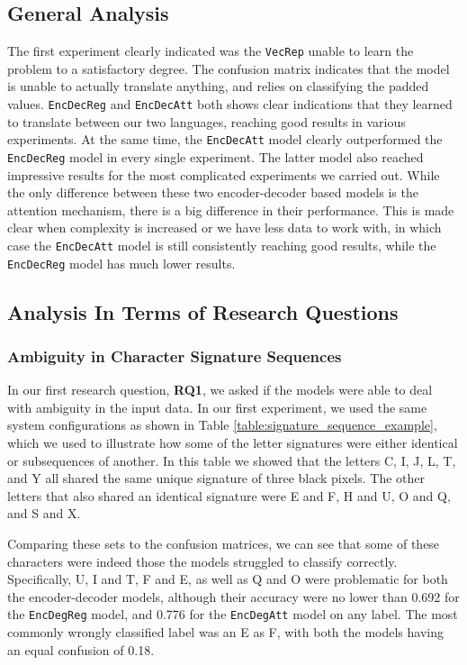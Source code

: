 \subsection{General Analysis}
The first experiment clearly indicated was the {\tt VecRep} unable to learn the problem to a satisfactory degree. The confusion matrix indicates that the model is unable to actually translate anything, and relies on classifying the padded values. {\tt EncDecReg} and {\tt EncDecAtt} both shows clear indications that they learned to translate between our two languages, reaching good results in various experiments. At the same time, the {\tt EncDecAtt} model clearly outperformed the {\tt EncDecReg} model in every single experiment. The latter model also reached impressive results for the most complicated experiments we carried out. While the only difference between these two encoder-decoder based models is the attention mechanism, there is a big difference in their performance. This is made clear when complexity is increased or we have less data to work with, in which case the {\tt EncDecAtt} model is still consistently reaching good results, while the {\tt EncDecReg} model has much lower results.

\subsection{Analysis In Terms of Research Questions}

\subsubsection{Ambiguity in Character Signature Sequences}
In our first research question, \textbf{RQ1}, we asked if the models were able to deal with ambiguity in the input data. In our first experiment, we used the same system configurations as shown in Table \ref{table:signature_sequence_example}, which we used to illustrate how some of the letter signatures were either identical or subsequences of another. In this table we showed that the letters C, I, J, L, T, and Y all shared the same unique signature of three black pixels. The other letters that also shared an identical signature were E and F, H and U, O and Q, and S and X. 

Comparing these sets to the confusion matrices, we can see that some of these characters were indeed those the models struggled to classify correctly. Specifically, U, I and T, F and E, as well as Q and O were problematic for both the encoder-decoder models, although their accuracy were no lower than 0.692 for the {\tt EncDegReg} model, and 0.776 for the {\tt EncDegAtt} model on any label. The most commonly wrongly classified label was an E as F, with both the models having an equal confusion of 0.18. 

